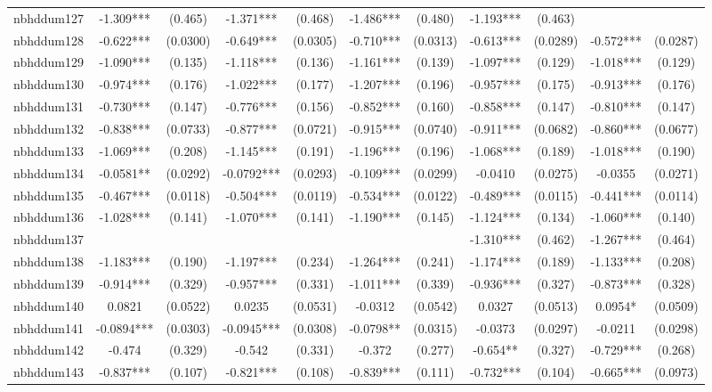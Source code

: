 \documentclass[]{article}
\begin{document}
\begin{tabular}{lcccccccccc}
nbhddum127 & -1.309*** & (0.465) & -1.371*** & (0.468) & -1.486*** & (0.480) & -1.193*** & (0.463) &  &  \\
nbhddum128 & -0.622*** & (0.0300) & -0.649*** & (0.0305) & -0.710*** & (0.0313) & -0.613*** & (0.0289) & -0.572*** & (0.0287) \\
nbhddum129 & -1.090*** & (0.135) & -1.118*** & (0.136) & -1.161*** & (0.139) & -1.097*** & (0.129) & -1.018*** & (0.129) \\
nbhddum130 & -0.974*** & (0.176) & -1.022*** & (0.177) & -1.207*** & (0.196) & -0.957*** & (0.175) & -0.913*** & (0.176) \\
nbhddum131 & -0.730*** & (0.147) & -0.776*** & (0.156) & -0.852*** & (0.160) & -0.858*** & (0.147) & -0.810*** & (0.147) \\
nbhddum132 & -0.838*** & (0.0733) & -0.877*** & (0.0721) & -0.915*** & (0.0740) & -0.911*** & (0.0682) & -0.860*** & (0.0677) \\
nbhddum133 & -1.069*** & (0.208) & -1.145*** & (0.191) & -1.196*** & (0.196) & -1.068*** & (0.189) & -1.018*** & (0.190) \\
nbhddum134 & -0.0581** & (0.0292) & -0.0792*** & (0.0293) & -0.109*** & (0.0299) & -0.0410 & (0.0275) & -0.0355 & (0.0271) \\
nbhddum135 & -0.467*** & (0.0118) & -0.504*** & (0.0119) & -0.534*** & (0.0122) & -0.489*** & (0.0115) & -0.441*** & (0.0114) \\
nbhddum136 & -1.028*** & (0.141) & -1.070*** & (0.141) & -1.190*** & (0.145) & -1.124*** & (0.134) & -1.060*** & (0.140) \\
nbhddum137 &  &  &  &  &  &  & -1.310*** & (0.462) & -1.267*** & (0.464) \\
nbhddum138 & -1.183*** & (0.190) & -1.197*** & (0.234) & -1.264*** & (0.241) & -1.174*** & (0.189) & -1.133*** & (0.208) \\
nbhddum139 & -0.914*** & (0.329) & -0.957*** & (0.331) & -1.011*** & (0.339) & -0.936*** & (0.327) & -0.873*** & (0.328) \\
nbhddum140 & 0.0821 & (0.0522) & 0.0235 & (0.0531) & -0.0312 & (0.0542) & 0.0327 & (0.0513) & 0.0954* & (0.0509) \\
nbhddum141 & -0.0894*** & (0.0303) & -0.0945*** & (0.0308) & -0.0798** & (0.0315) & -0.0373 & (0.0297) & -0.0211 & (0.0298) \\
nbhddum142 & -0.474 & (0.329) & -0.542 & (0.331) & -0.372 & (0.277) & -0.654** & (0.327) & -0.729*** & (0.268) \\
nbhddum143 & -0.837*** & (0.107) & -0.821*** & (0.108) & -0.839*** & (0.111) & -0.732*** & (0.104) & -0.665*** & (0.0973) \\

\end{tabular}
\end{document}
